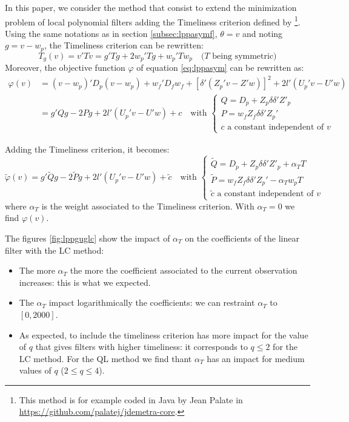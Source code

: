 \documentclass[
  12pt,
  ,
  a4paper]{article}
\newcommand\1{\mathds{1}}
\begin{document}
In this paper, we consider the method that consist to extend the minimization problem of local polynomial filters adding the Timeliness criterion defined by \textcite{ch15HBSA}\footnote{This method is for example coded in Java by Jean Palate in \url{https://github.com/palatej/jdemetra-core}.}.
Using the same notations as in section \ref{subsec:lppasymf}, \(\theta=v\) and noting \(g=v-w_p\), the Timeliness criterion can be rewritten:
\[
T_g(v)=v'Tv=g'Tg+2w_p'Tg+w_p'Tw_p
\quad(T\text{ being symmetric)}
\]
Moreover, the objective function \(\varphi\) of equation \eqref{eq:lppasym} can be rewritten as:
\begin{align*}
\varphi(v)&=(v-w_{p})'D_{p}(v-w_{p})+
  w_{f}'D_{f}w_{f}+
  [\delta'(Z_{p}'v-Z'w)]^{2}+
2l'(U_{p}'v-U'w)\\
&=g'Qg-2Pg+2l'(U_{p}'v-U'w)+c\quad\text{with }
\begin{cases}
Q=D_p+Z_p\delta\delta'Z'_p \\
P=w_fZ_f\delta\delta'Z_p'\\
c\text{ a constant independent of }v
\end{cases}
\end{align*}

Adding the Timeliness criterion, it becomes:
\[
\widetilde\varphi(v)=g'\widetilde Qg-
2\widetilde Pg+2l'(U_{p}'v-U'w)+
\widetilde c\quad\text{with }
\begin{cases}
\widetilde Q=D_p+Z_p\delta\delta'Z'_p +\alpha_TT\\
\widetilde P=w_fZ_f\delta\delta'Z_p'-\alpha_Tw_pT\\
\widetilde c\text{ a constant independent of }v
\end{cases}
\]
where \(\alpha_T\) is the weight associated to the Timeliness criterion. With \(\alpha_T=0\) we find \(\varphi(v)\).

The figures \ref{fig:lppguglc} show the impact of \(\alpha_T\) on the coefficients of the linear filter with the LC method:

\begin{itemize}
\item
  The more \(\alpha_T\) the more the coefficient associated to the current observation increases: this is what we expected.
\item
  The \(\alpha_T\) impact logarithmically the coefficients: we can restraint \(\alpha_T\) to \([0,2000]\).
\item
  As expected, to include the timeliness criterion has more impact for the value of \(q\) that gives filters with higher timeliness: it corresponds to \(q\leq2\) for the LC method. For the QL method we find thant \(\alpha_T\) has an impact for medium values of \(q\) (\(2\leq q\leq4\)).
\end{itemize}
\end{document}
